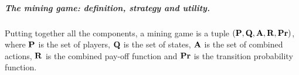 \subparagraph*{The mining game: definition, strategy and utility.}
Putting together all the components,  
a mining game is a tuple $(\mathbf{P},\mathbf{Q},\mathbf{A},\mathbf{R},\mathbf{Pr})$, where $\mathbf{P}$ is the set of players, $\mathbf{Q}$ is the set of states, $\mathbf{A}$ is the set of combined actions, $\mathbf{R}$ is the combined pay-off function 
and $\mathbf{Pr}$ is the transition probability function. 

